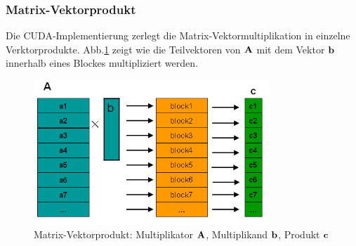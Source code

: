 

\subsubsection{Matrix-Vektorprodukt}

Die CUDA-Implementierung zerlegt die Matrix-Vektormultiplikation in einzelne
Verktorprodukte.
Abb.\ref{MatrixVektor} zeigt wie die Teilvektoren von $ \bf A$ mit dem Vektor $ \bf b$
innerhalb eines Blockes multipliziert werden.


\begin{figure}[htbp]
\includegraphics[width=3.5in]{../xby/pic//MatrixVektor}
\caption{ \label{MatrixVektor} Matrix-Vektorprodukt: Multiplikator $\bf A$, Multiplikand $ \bf b$, Produkt $\bf c$ }

\end{figure}
